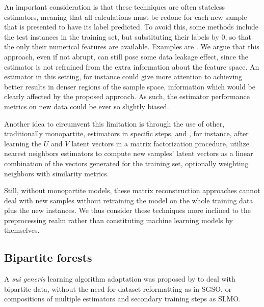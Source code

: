 An important consideration is that these techniques are often stateless
estimators, meaning that all calculations must be redone for each new sample
that is presented to have its label predicted. To avoid this, some methods
include the test instances in the training set, but substituting their labels by
0, so that the only their numerical features are available. Examples are
\cite{}. We argue that this approach, even if not abrupt, can still pose some
data leakage effect, since the estimator is not refrained from the extra
information about the feature space. An estimator in this setting, for instance
could give more attention to achieving better results in denser regions of the
sample space, information which would be clearly affected by the proposed
approach. As such, the estimator performance metrics on new data could be ever
so slightly biased.

Another idea to circumvent this limitation is through the use of other,
traditionally monopartite, estimators in specific steps. \cite{} and \cite{},
for instance, after learning the $U$ and $V$ latent vectors in a matrix
factorization procedure, utilize nearest neighbors estimators to compute new
samples' latent vectors as a linear combination of the vectors generated for the
training set, optionally weighting neighbors with similarity metrics.

Still, without monopartite models, these matrix reconstruction approaches cannot
deal with new samples without retraining the model on the whole training data
plus the new instances. We thus consider these techniques more inclined to the
preprocessing realm rather than constituting machine learning models by
themselves.



\subsection{Bipartite forests}
\label{sec:bipartite_forests}

A \textit{sui generis} learning algorithm adaptation was proposed by \citet{pliakos2018} to deal with bipartite data, without the need for dataset reformatting as in SGSO, or compositions of multiple estimators and secondary training steps as SLMO.

